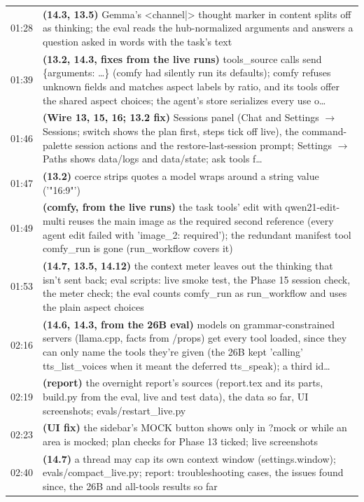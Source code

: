 \begin{longtable}{@{}l>{\raggedright\arraybackslash}p{14.2cm}@{}}
01:28 & \textbf{(14.3, 13.5)} Gemma's <channel|> thought marker in content splits off as thinking; the eval reads the hub-normalized arguments and answers a question asked in words with the task's text \\
01:39 & \textbf{(13.2, 14.3, fixes from the live runs)} tools\_source calls send \{arguments: \ldots{}\} (comfy had silently run its defaults); comfy refuses unknown fields and matches aspect labels by ratio, and its tools offer the shared aspect choices; the agent's store serializes every use o… \\
01:46 & \textbf{(Wire 13, 15, 16; 13.2 fix)} Sessions panel (Chat and Settings $\rightarrow$ Sessions; switch shows the plan first, steps tick off live), the command-palette session actions and the restore-last-session prompt; Settings $\rightarrow$ Paths shows data/logs and data/state; ask tools f… \\
01:47 & \textbf{(13.2)} coerce strips quotes a model wraps around a string value ('"16:9"') \\
01:49 & \textbf{(comfy, from the live runs)} the task tools' edit with qwen21-edit-multi reuses the main image as the required second reference (every agent edit failed with 'image\_2: required'); the redundant manifest tool comfy\_run is gone (run\_workflow covers it) \\
01:53 & \textbf{(14.7, 13.5, 14.12)} the context meter leaves out the thinking that isn't sent back; eval scripts: live smoke test, the Phase 15 session check, the meter check; the eval counts comfy\_run as run\_workflow and uses the plain aspect choices \\
02:16 & \textbf{(14.6, 14.3, from the 26B eval)} models on grammar-constrained servers (llama.cpp, facts from /props) get every tool loaded, since they can only name the tools they're given (the 26B kept 'calling' tts\_list\_voices when it meant the deferred tts\_speak); a third id… \\
02:19 & \textbf{(report)} the overnight report's sources (report.tex and its parts, build.py from the eval, live and test data), the data so far, UI screenshots; evals/restart\_live.py \\
02:23 & \textbf{(UI fix)} the sidebar's MOCK button shows only in ?mock or while an area is mocked; plan checks for Phase 13 ticked; live screenshots \\
02:40 & \textbf{(14.7)} a thread may cap its own context window (settings.window); evals/compact\_live.py; report: troubleshooting cases, the issues found since, the 26B and all-tools results so far \\

\end{longtable}

